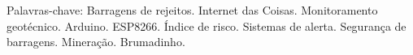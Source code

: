 \begin{resumo}
\begin{SingleSpace}
\vspace{\onelineskip}
\noindent Palavras-chave: Barragens de rejeitos. Internet das Coisas. Monitoramento geotécnico. Arduino. ESP8266. Índice de risco. Sistemas de alerta. Segurança de barragens. Mineração. Brumadinho.

\end{SingleSpace}
\end{resumo}